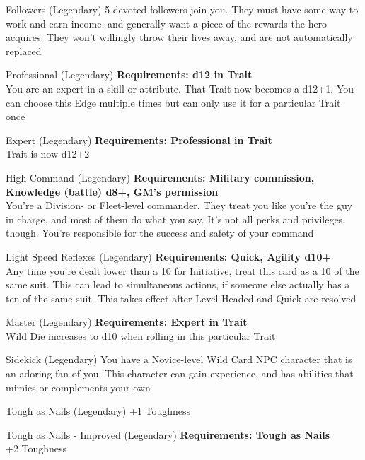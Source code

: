 \begin{multicols}{2}
\begin{genericsection}{Followers (Legendary)}
5 devoted followers join you. They must have some way to work and earn income, and generally want a piece of the rewards the hero acquires. They won't willingly throw their lives away, and are not automatically replaced
\end{genericsection}

\begin{genericsection}{Professional (Legendary)}
\textbf{Requirements: d12 in Trait}\\
You are an expert in a skill or attribute. That Trait now becomes a d12+1. You can choose this Edge multiple times but can only use it for a particular Trait once
\end{genericsection}

\begin{genericsection}{Expert (Legendary)}
\textbf{Requirements: Professional in Trait}\\
Trait is now d12+2
\end{genericsection}

\begin{genericsection}{High Command (Legendary)}
\textbf{Requirements: Military commission, Knowledge (battle) d8+, GM's permission}\\
You’re a Division- or Fleet-level commander. They treat you like you’re the guy in charge, and most of them do what you say. It’s not all perks and privileges, though. You’re responsible for the success and safety of your command
\end{genericsection}

\begin{genericsection}{Light Speed Reflexes (Legendary)}
\textbf{Requirements: Quick, Agility d10+}\\
Any time you're dealt lower than a 10 for Initiative, treat this card as a 10 of the same suit. This can lead to simultaneous actions, if someone else actually has a ten of the same suit. This takes effect after Level Headed and Quick are resolved
\end{genericsection}

\begin{genericsection}{Master (Legendary)}
\textbf{Requirements: Expert in Trait}\\
Wild Die increases to d10 when rolling in this particular Trait
\end{genericsection}

\begin{genericsection}{Sidekick (Legendary)}
You have a Novice-level Wild Card NPC character that is an adoring fan of you. This character can gain experience, and has abilities that mimics or complements your own
\end{genericsection}

\begin{genericsection}{Tough as Nails (Legendary)}
+1 Toughness
\end{genericsection}

\begin{genericsection}{Tough as Nails - Improved (Legendary)}
\textbf{Requirements: Tough as Nails}\\
+2 Toughness
\end{genericsection}


\end{multicols}
